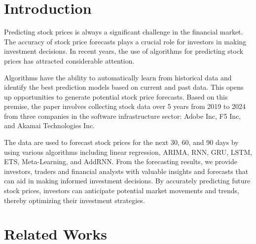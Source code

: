 \documentclass{ieeeojies}
\begin{document}
\section{Introduction}
\label{sec:introduction}
Predicting stock prices is always a significant challenge in the financial market. The accuracy of stock price forecasts plays a crucial role for investors in making investment decisions. In recent years, the use of algorithms for predicting stock prices has attracted considerable attention.

Algorithms have the ability to automatically learn from historical data and identify the best prediction models based on current and past data. This opens up opportunities to generate potential stock price forecasts. Based on this premise, the paper involves collecting stock data over 5 years from 2019 to 2024 from three companies in the software infrastructure sector: Adobe Inc, F5 Inc, and Akamai Technologies Inc. 

The data are used to forecast stock prices for the next 30, 60, and 90 days by using various algorithms including linear regression, ARIMA, RNN, GRU, LSTM, ETS, Meta-Learning, and AddRNN. From the forecasting results, we provide investors, traders and financial analysts with valuable insights and forecasts that can aid in making informed investment decisions. By accurately predicting future stock prices, investors can anticipate potential market movements and trends, thereby optimizing their investment strategies.


\section{Related Works}


\end{document}
